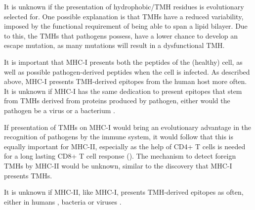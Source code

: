 It is unknown if the presentation of hydrophobic/TMH residues
is evolutionary selected for.
One possible explanation is that TMHs have a reduced variability,
imposed by the functional requirement of being able to span a lipid bilayer.
Due to this, the TMHs that pathogens possess, 
have a lower chance to develop an escape mutation,
as many mutations will result in a dysfunctional TMH.


It is important that MHC-I presents both the peptides of the 
(healthy) cell, as well as possible pathogen-derived peptides when the
cell is infected. As described above, MHC-I presents TMH-derived epitopes 
from the human host more often. It is unknown if MHC-I has the same
dedication to present epitopes that stem from TMHs derived from
proteins produced by pathogen, either would the pathogen
be a virus  or 
a bacterium .


If presentation of TMHs on MHC-I would bring an evolutionary advantage 
in the recognition of pathogens by the immune system, 
it would follow that this is equally important for MHC-II, 
especially as the help of CD4+ T cells is needed for a long lasting CD8+ T cell 
response (\cite{novy2007cd4}). 
The mechanism to detect foreign TMHs by MHC-II would be unknown, 
similar to the discovery that MHC-I presents TMHs.


It is unknown if MHC-II, like MHC-I, 
presents TMH-derived epitopes as often, either 
in humans ,
bacteria 
or viruses .


